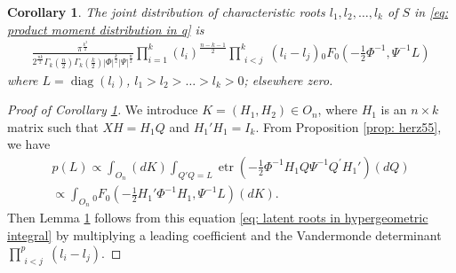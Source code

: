 \documentclass{amsart}
\newtheorem{corollary}[theorem]{Corollary}
\theoremstyle{definition}
\numberwithin{equation}{section}
\begin{document}
\begin{corollary}\label{lem: latent} The joint distribution of characteristic roots $l_{1}, l_{2}, \dots, l_{k}$ of $S$ in \eqref{eq: product moment distribution in q} is
    \begin{equation*}
        \begin{aligned}
      \frac{\pi^{\frac{k^{2}}{2}}}{2^{\frac{nk}{2}}\varGamma_{k}(\frac{n}{2})\varGamma_{k}(\frac{k}{2})| \varPhi|^{\frac{k}{2}}| \varPsi|^{\frac{n}{2}}} \prod_{i=1}^{k}(l_i)^{\frac{n-k-1}{2}}\prod_{\substack{i<j}}^{k} (l_{i} - l_{j})%
    {}_0F_{0}\left(-\frac{1}{2} \varPhi^{-1},  \varPsi^{-1} L\right)
        \end{aligned}
    \end{equation*}
    where $ L = \operatorname{diag}(l_{i})$, $l_{1} > l_{2} > \dots > l_{k}>0$; elsewhere zero. 
\end{corollary}

\begin{proof}[Proof of Corollary \ref{lem: latent}]
     We introduce $ K = (H_1,  H_{2}) \in O_n$, where $ H_{1}$ is an $n \times k$ matrix such that $ X  H =  H_{1}  Q$ and $H_1'H_1 = I_k$. From Proposition \ref{prop: herz55}, we have
\begin{equation}
    \begin{aligned}
       p( L)    \propto \int_{O_n} (dK) \int_{ Q'  Q = L } \operatorname{etr} \left( -\frac{1}{2} \varPhi^{-1} H_1  Q \varPsi^{-1} Q^{\prime} H_1' \right) (d Q)\\
        \propto \int_{O_n}  {}_0F_{0}\left(-\frac{1}{2} H_1'  \varPhi^{-1}  H_1,  \varPsi^{-1} L\right)(dK).
    \end{aligned}
    \label{eq: latent roots in hypergeometric integral}
\end{equation}
Then Lemma \ref{lem: latent} follows from this equation \eqref{eq: latent roots in hypergeometric integral} by multiplying a leading coefficient and the Vandermonde determinant $\prod_{\substack{i<j}}^{p} (l_{i} - l_{j})$.
\end{proof}
\end{document}
